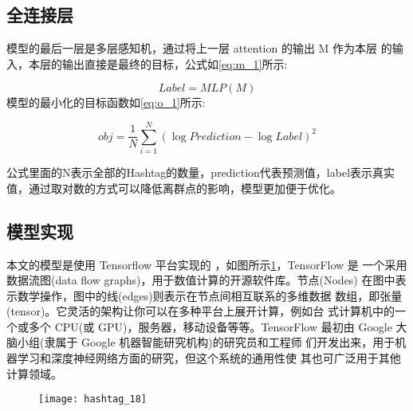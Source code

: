 \subsection{全连接层}
模型的最后一层是多层感知机，通过将上一层 attention 的输出 M 作为本层
 的输入，本层的输出直接是最终的目标，公式如\ref{eq:m_1}所示:

\begin{equation}\label{eq:m_1}
Label = MLP(M)
\end{equation}
模型的最小化的目标函数如\ref{eq:o_1}所示:


\begin{equation}\label{eq:o_1}
obj = \frac{1}{N}\sum_{i=1}^N(\log Prediction - \log Label)^2
\end{equation}

公式里面的N表示全部的Hashtag的数量，prediction代表预测值，label表示真实值，通过取对数的方式可以降低离群点的影响，模型更加便于优化。

\subsection{模型实现}


本文的模型是使用 Tensorflow 平台实现的 \citep{Abadi2016TensorFlow}，如图所示\ref{fig:4_1}，TensorFlow 是 一个采用数据流图(data flow graphs)，用于数值计算的开源软件库。节点(Nodes) 在图中表示数学操作，图中的线(edges)则表示在节点间相互联系的多维数据 数组，即张量(tensor)。它灵活的架构让你可以在多种平台上展开计算，例如台 式计算机中的一个或多个 CPU(或 GPU)，服务器，移动设备等等。TensorFlow 最初由 Google 大脑小组(隶属于 Google 机器智能研究机构)的研究员和工程师 们开发出来，用于机器学习和深度神经网络方面的研究，但这个系统的通用性使 其也可广泛用于其他计算领域。

\begin{figure}[H]
    \centering
    \texttt{[image: hashtag\_18]}
    \label{fig:4_1}
\end{figure}

